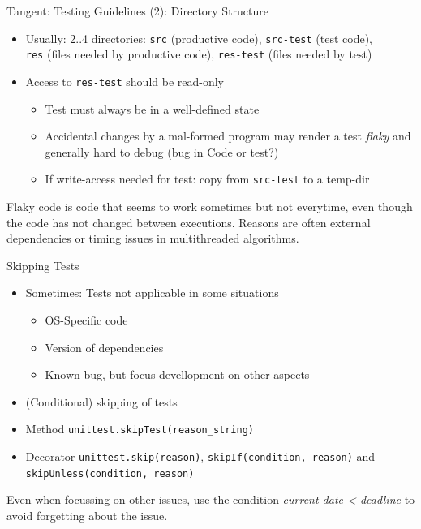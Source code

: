 
\begin{frame}{Tangent: Testing Guidelines (2): Directory Structure}
%
\begin{itemize}
\item Usually: 2..4 directories: \texttt{src} (productive code), \texttt{src-test} (test code),\\
	\texttt{res} (files needed by productive code), \texttt{res-test} (files needed by test)
\item Access to \texttt{res-test} should be read-only
	\begin{itemize}
	\item Test must always be in a well-defined state
	\item Accidental changes by a mal-formed program may render a test \emph{flaky} and generally hard to debug (bug in Code or test?)
	\item[\Thus] If write-access needed for test: copy from \texttt{src-test} to a temp-dir
	\end{itemize}
\end{itemize}
%
\begin{hintbox}
\footnotesize
Flaky code is code that seems to work sometimes but not everytime, even though the code has not changed between executions.
Reasons are often external dependencies or timing issues in multithreaded algorithms.
\end{hintbox}
%
\end{frame}


\begin{frame}{Skipping Tests}
%
\begin{itemize}
\item Sometimes: Tests not applicable in some situations
	\begin{itemize}
	\item OS-Specific code
	\item Version of dependencies
	\item Known bug, but focus devellopment on other aspects
	\end{itemize}
\item (Conditional) skipping of tests
\item Method \texttt{unittest.skipTest(reason\_string)}
\item Decorator \texttt{unittest.skip(reason)}, \texttt{skipIf(condition, reason)} and \texttt{skipUnless(condition, reason)}
\end{itemize}
%
\begin{hintbox}
\footnotesize
Even when focussing on other issues, use the condition \emph{current date < deadline} to avoid forgetting about the issue.
\end{hintbox}
%
\end{frame}

